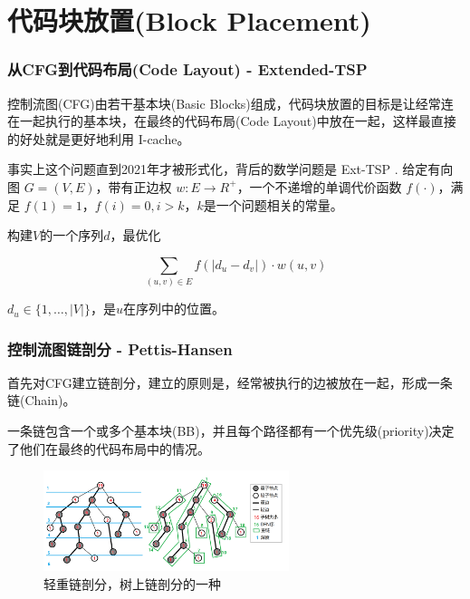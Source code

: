 \section{代码块放置(Block Placement)}

\begin{frame}
    \frametitle{从CFG到代码布局(Code Layout) - Extended-TSP}

    控制流图(CFG)由若干基本块(Basic Blocks)组成，代码块放置的目标是让经常连在一起执行的基本块，在最终的代码布局(Code Layout)中放在一起，这样最直接的好处就是更好地利用 I-cache。

    事实上这个问题直到2021年才被形式化，背后的数学问题是 Ext-TSP \cite{mestre2021extended}. 给定有向图 $G = (V, E)$，带有正边权 $w: E \rightarrow R^{+}$，一个不递增的单调代价函数 $f(\cdot)$，满足 $f(1) = 1$，$f(i) = 0, i > k$，$k$是一个问题相关的常量。

    构建$V$的一个序列$d$，最优化

    \begin{equation}
        \sum_{(u, v) \in E} f(\left\lvert d_u - d_v \right\rvert) \cdot w(u, v)
    \end{equation}

    $d_u \in \lbrace 1, \dots, \left\lvert V \right\rvert \rbrace$，是$u$在序列中的位置。
\end{frame}

\begin{frame}
    \frametitle{控制流图链剖分 - Pettis-Hansen}

    首先对CFG建立链剖分，建立的原则是，经常被执行的边被放在一起，形成一条链(Chain)。

    一条链包含一个或多个基本块(BB)，并且每个路径都有一个优先级(priority)决定了他们在最终的代码布局中的情况。

    \begin{figure}
        \centering
        \includegraphics[width=0.64\textwidth]{images/hld.png}
        \caption{\cite{unknown-author-2022}轻重链剖分，树上链剖分的一种}
    \end{figure}

\end{frame}


